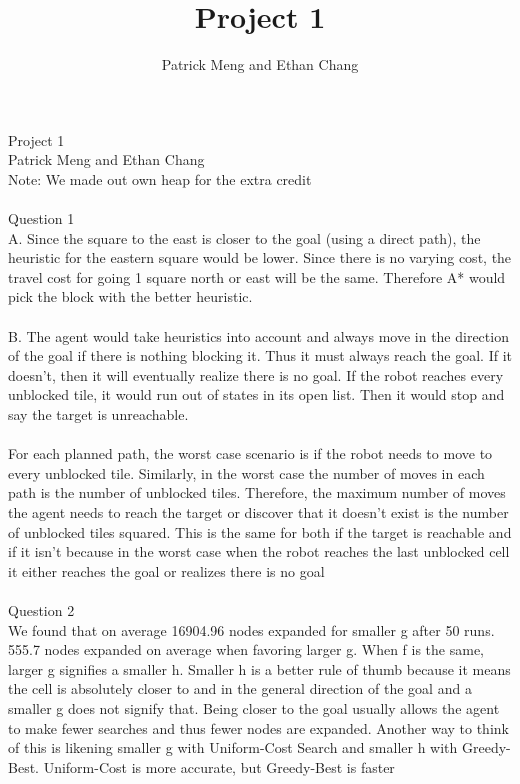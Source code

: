 \documentclass{article}
\begin{document}
\title{Project 1}
\author{Patrick Meng and Ethan Chang}
Project 1
\\
Patrick Meng and Ethan Chang
\\
Note: We made out own heap for the extra credit
\\\\
Question 1
\\
A.  Since the square to the east is closer to the goal (using a direct path), the heuristic for the eastern square would be lower.  Since there is no varying cost, the travel cost for going 1 square north or east will be the same.  Therefore A* would pick the block with the better heuristic.  
\\\\
B.  The agent would take heuristics into account and always move in the direction of the goal if there is nothing blocking it.  Thus it must always reach the goal.  If it doesn’t, then it will eventually realize there is no goal.  If the robot reaches every unblocked tile, it would run out of states in its open list.  Then it would stop and say the target is unreachable.  
\\\\
	For each planned path, the worst case scenario is if the robot needs to move to every unblocked tile.  Similarly, in the worst case the number of moves in each path is the number of unblocked tiles.  Therefore, the maximum number of moves the agent needs to reach the target or discover that it doesn’t exist is the number of unblocked tiles squared.  This is the same for both if the target is reachable and if it isn’t because in the worst case when the robot reaches the last unblocked cell it either reaches the goal or realizes there is no goal
\\\\
Question 2
\\
We found that on average 16904.96 nodes expanded for smaller g after 50 runs.  555.7 nodes expanded on average when favoring larger g. When f is the same, larger g signifies a smaller h. Smaller h is a better rule of thumb because it means the cell is absolutely closer to and in the general direction of the goal and a smaller g does not signify that.  Being closer to the goal usually allows the agent to make fewer searches and thus fewer nodes are expanded.  Another way to think of this is likening smaller g with Uniform-Cost Search and smaller h with Greedy-Best.  Uniform-Cost is more accurate, but Greedy-Best is faster
\end{document}
